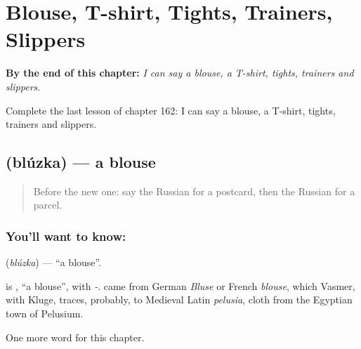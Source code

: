 
\chapter{Blouse, T-shirt, Tights, Trainers, Slippers}
\label{ch:ru-blouse-t-shirt-tights-trainers-slippers}

\begin{chapteropening}
\textbf{By the end of this chapter:} \emph{I can say a blouse, a T-shirt, tights, trainers and slippers.}

Complete the last lesson of chapter 162: I can say a blouse, a T-shirt, tights, trainers and slippers.
\end{chapteropening}

\section[\texorpdfstring{\ru{блузка} (blúzka)}{блузка (blúzka)}]{ (blúzka) — a blouse}

\label{lesson:RU-C162-bluzka}



\begin{quote}
Before the new one: say the Russian for a postcard, then the Russian for a parcel.
\end{quote}

\subsection*{You'll want to know: }
\textbf{} (\emph{blúzka}) — \textquotedblleft{}a blouse\textquotedblright{}.

\begin{cousinweb}
\textbf{} is \emph{}, \textquotedblleft{}a blouse\textquotedblright{}, with \emph{-}. \emph{} came from German \emph{Bluse} or French \emph{blouse}, which Vasmer, with Kluge, traces, probably, to Medieval Latin \emph{pelusia}, cloth from the Egyptian town of Pelusium.
\end{cousinweb}

\begin{grammarlens}[title={What you've built}]
One more word for this chapter.
\end{grammarlens}

